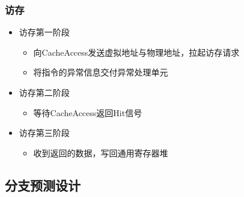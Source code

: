 \documentclass{beamer}
\begin{document}
\begin{frame}
    \frametitle{访存}
    \begin{itemize}
        \item 访存第一阶段\begin{itemize}
            \item 向CacheAccess发送虚拟地址与物理地址，拉起访存请求
            \item 将指令的异常信息交付异常处理单元
        \end{itemize}
        \item 访存第二阶段\begin{itemize}
            \item 等待CacheAccess返回Hit信号
        \end{itemize}
        \item 访存第三阶段\begin{itemize}
            \item 收到返回的数据，写回通用寄存器堆
        \end{itemize}
    \end{itemize}
\end{frame}

\subsection{分支预测设计}
\end{document}
